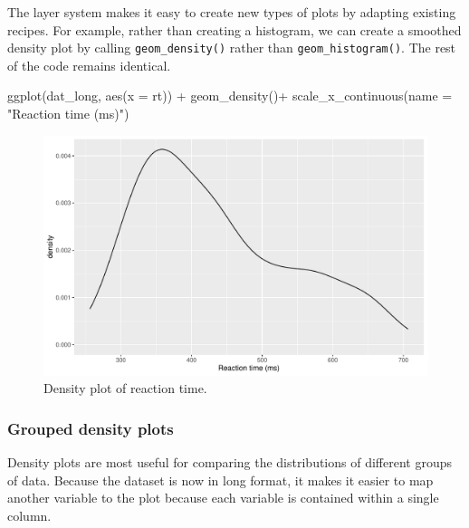 \documentclass[
  english,
  doc,floatsintext]{apa6}
\newenvironment{Shaded}{\begin{snugshade}}{\end{snugshade}}
\newcommand{\AttributeTok}[1]{\textcolor[rgb]{0.77,0.63,0.00}{#1}}
\newcommand{\FunctionTok}[1]{\textcolor[rgb]{0.00,0.00,0.00}{#1}}
\newcommand{\NormalTok}[1]{#1}
\newcommand{\SpecialCharTok}[1]{\textcolor[rgb]{0.00,0.00,0.00}{#1}}
\newcommand{\StringTok}[1]{\textcolor[rgb]{0.31,0.60,0.02}{#1}}
\begin{document}
The layer system makes it easy to create new types of plots by adapting existing recipes. For example, rather than creating a histogram, we can create a smoothed density plot by calling \texttt{geom\_density()} rather than \texttt{geom\_histogram()}. The rest of the code remains identical.

\begin{Shaded}
\begin{Highlighting}[]
\FunctionTok{ggplot}\NormalTok{(dat\_long, }\FunctionTok{aes}\NormalTok{(}\AttributeTok{x =}\NormalTok{ rt)) }\SpecialCharTok{+}
  \FunctionTok{geom\_density}\NormalTok{()}\SpecialCharTok{+}
  \FunctionTok{scale\_x\_continuous}\NormalTok{(}\AttributeTok{name =} \StringTok{"Reaction time (ms)"}\NormalTok{)}
\end{Highlighting}
\end{Shaded}

\begin{figure}

{\centering \includegraphics[width=1\linewidth]{images/density-rt-1} 

}

\caption{Density plot of reaction time.}\label{fig:density-rt}
\end{figure}

\hypertarget{grouped-density-plots}{%
\subsubsection{Grouped density plots}\label{grouped-density-plots}}

Density plots are most useful for comparing the distributions of different groups of data. Because the dataset is now in long format, it makes it easier to map another variable to the plot because each variable is contained within a single column.
\end{document}
